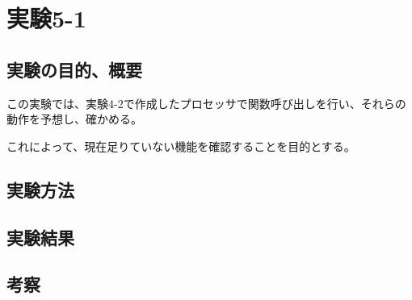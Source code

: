 \section{実験5-1}
\subsection{実験の目的、概要}
この実験では、実験4-2で作成したプロセッサで関数呼び出しを行い、それらの動作を予想し、確かめる。

これによって、現在足りていない機能を確認することを目的とする。

\subsection{実験方法}

\subsection{実験結果}

\subsection{考察}
